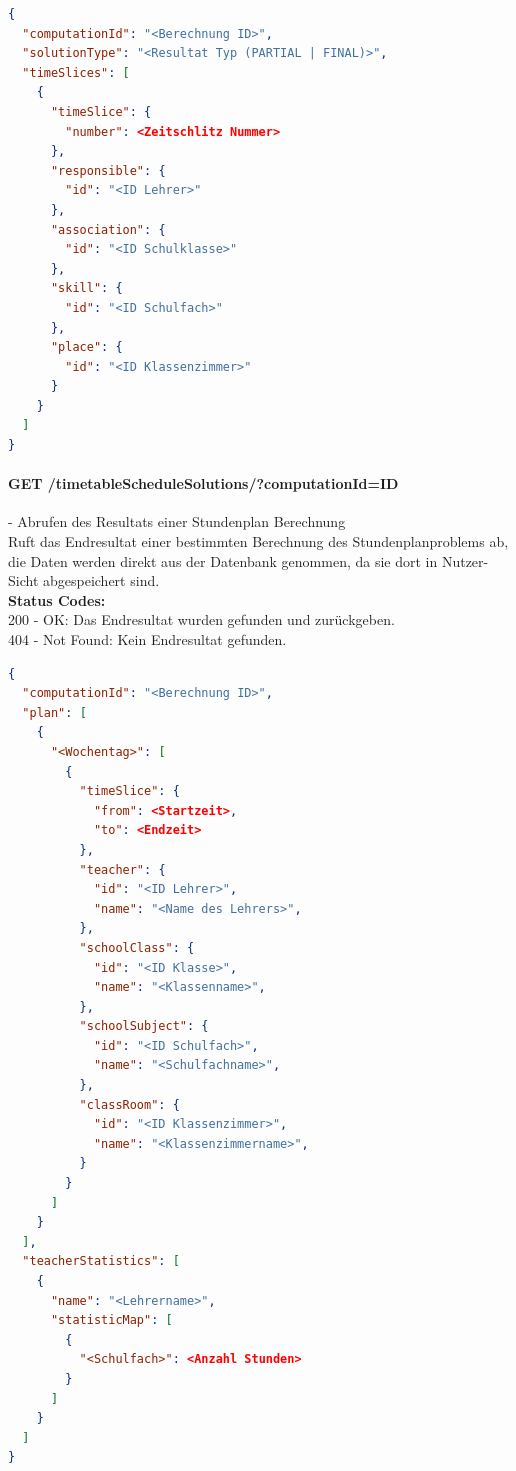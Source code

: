 \begin{lstlisting}[language=JSON, caption=Beispiel eines Resultates für das Stundenplanproblem aus Algorithmus-Sicht, label=lst:solution_timetableScheduling_algo]  
{
  "computationId": "<Berechnung ID>",
  "solutionType": "<Resultat Typ (PARTIAL | FINAL)>",
  "timeSlices": [
    {
      "timeSlice": {
        "number": <Zeitschlitz Nummer>
      },
      "responsible": {
        "id": "<ID Lehrer>"
      },
      "association": {
        "id": "<ID Schulklasse>"
      },
      "skill": {
        "id": "<ID Schulfach>"
      },
      "place": {
        "id": "<ID Klassenzimmer>"
      }
    }
  ]
}
\end{lstlisting}

\paragraph{GET /timetableScheduleSolutions/?computationId={ID}} - Abrufen des Resultats einer Stundenplan Berechnung\mbox{}\\
Ruft das Endresultat einer bestimmten Berechnung des Stundenplanproblems ab, die Daten werden direkt aus der Datenbank genommen, da sie dort in Nutzer-Sicht abgespeichert sind.\\
\textbf{Status Codes:}\\
200 - OK: Das Endresultat wurden gefunden und zurückgeben.\\
404 - Not Found: Kein Endresultat gefunden.\\

\begin{lstlisting}[language=JSON, caption=Beispiel eines Endresultates für das Stundenplanproblem, label=lst:solution_timetableScheduling]  
{
  "computationId": "<Berechnung ID>",
  "plan": [
    {
      "<Wochentag>": [
        {
          "timeSlice": {
            "from": <Startzeit>,
            "to": <Endzeit>
          },
          "teacher": {
            "id": "<ID Lehrer>",
            "name": "<Name des Lehrers>",
          },
          "schoolClass": {
            "id": "<ID Klasse>",
            "name": "<Klassenname>",
          },
          "schoolSubject": {
            "id": "<ID Schulfach>",
            "name": "<Schulfachname>",
          },
          "classRoom": {
            "id": "<ID Klassenzimmer>",
            "name": "<Klassenzimmername>",
          }
        }
      ]
    }
  ],
  "teacherStatistics": [
    {
      "name": "<Lehrername>",
      "statisticMap": [
        {
          "<Schulfach>": <Anzahl Stunden>
        }
      ]
    }
  ]
}
\end{lstlisting}

